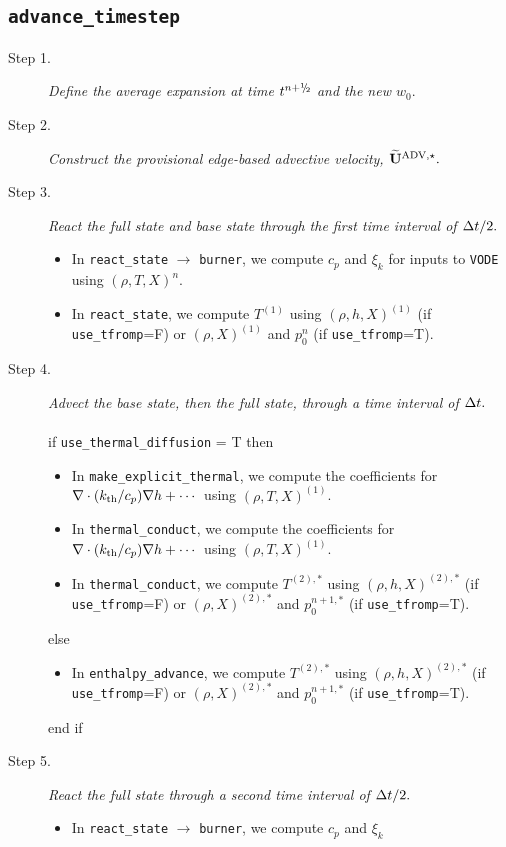 \subsection{{\tt advance\_timestep}}
\begin{description}
\item[Step 1.] {\em Define the average expansion at time $t^\nph$ and the new $w_0.$}
\item[Step 2.] {\em Construct the provisional edge-based advective velocity, $\widetilde{\mathbf{U}}^{\mathrm{ADV},\star}.$}
\item[Step 3.] {\em React the full state and base state through the first time interval 
of $\Delta t/2.$}
\begin{itemize}
\item In {\tt react\_state} $\rightarrow$ {\tt burner}, we compute $c_p$ and $\xi_k$ 
for inputs to {\tt VODE} using $(\rho,T,X)^n$.
\item In {\tt react\_state}, we compute $T^{(1)}$ using $(\rho,h,X)^{(1)}$ 
(if {\tt use\_tfromp}=F) or $(\rho,X)^{(1)}$ and $p_0^n$ (if {\tt use\_tfromp}=T).
\end{itemize}
\item[Step 4.] {\em Advect the base state, then the full state, through a time interval 
of $\Delta t.$}\\ \\
if {\tt use\_thermal\_diffusion} = T then
\begin{itemize}
\item In {\tt make\_explicit\_thermal}, we compute the coefficients for 
$\nabla\cdot(k_{\rm th}/c_p)\nabla h + \cdots$ using $(\rho,T,X)^{(1)}$.
\item In {\tt thermal\_conduct}, we compute the coefficients for 
$\nabla\cdot(k_{\rm th}/c_p)\nabla h + \cdots$ using $(\rho,T,X)^{(1)}$.
\item In {\tt thermal\_conduct}, we compute $T^{(2),*}$ using $(\rho,h,X)^{(2),*}$
(if {\tt use\_tfromp}=F) or $(\rho,X)^{(2),*}$ and $p_0^{n+1,*}$ (if {\tt use\_tfromp}=T).
\end{itemize}
else
\begin{itemize}
\item In {\tt enthalpy\_advance}, we compute $T^{(2),*}$ using $(\rho,h,X)^{(2),*}$
(if {\tt use\_tfromp}=F) or $(\rho,X)^{(2),*}$ and $p_0^{n+1,*}$ (if {\tt use\_tfromp}=T).
\end{itemize}
end if
\item[Step 5.] {\em React the full state through a second time interval of $\Delta t/2.$}
\begin{itemize}
\item In {\tt react\_state} $\rightarrow$ {\tt burner}, we compute $c_p$ and $\xi_k$ 

\end{itemize}
\end{description}
